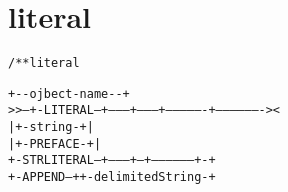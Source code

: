 \section{literal}
\begin{shaded}
\begin{alltt}
/** literal

                   +-{-ojbect-name-}-+
   >>--+-LITERAL---+--------+--------+----------------+-------------------><
       |           +-string-+                         |
       |             +-PREFACE-+                      |
       +-STRLITERAL--+---------+--+-----------------+-+
                     +-APPEND--+  +-delimitedString-+
\end{alltt}
\end{shaded}
